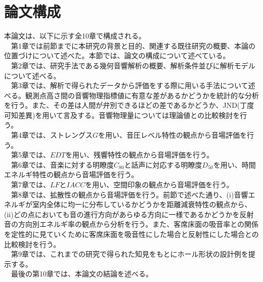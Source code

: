 \pagebreak
\section{論文構成}
本論文は、以下に示す全10章で構成される。
\\　第1章では前節までに本研究の背景と目的、関連する既往研究の概要、本論の位置づけについて述べた。本節では、論文の構成について述べている。
\\　第2章では、研究手法である幾何音響解析の概要、解析条件並びに解析モデルについて述べる。
\\　第3章では、解析で得られたデータから評価をする際に用いる手法について述べる。観測点高さ間の音響物理指標値に有意な差があるかどうかを統計的な分析を行う。また、その差は人間が弁別できるほどの差であるかどうか、JND(丁度可知差異)を用いて言及する。音響物理量については理論値との比較検討を行う。
\\　第4章では、ストレングス$G$を用い、音圧レベル特性の観点から音場評価を行う。
\\　第5章では、$EDT$を用い、残響特性の観点から音場評価を行う。
\\　第6章では、音楽に対する明瞭度$C_{80}$と話声に対応する明瞭度$D_{50}$を用い、時間エネルギ特性の観点から音場評価を行う。
\\　第7章では、$LF$と$IACC$を用い、空間印象の観点から音場評価を行う。
\\　第8章では、拡散性の観点から音場評価を行う。前節で述べた通り、(i)音響エネルギが室内全体に均一に分布しているかどうかを距離減衰特性の観点から、(i\hspace{-.05em}i)どの点においても音の進行方向があらゆる方向に一様であるかどうかを反射音の方向別エネルギ率の観点から分析を行う。また、客席床面の吸音率との関係を定性的に見ていくために客席床面を吸音性にした場合と反射性にした場合との比較検討を行う。
\\　第9章では、これまでの研究で得られた知見をもとにホール形状の設計例を提示する。
\\　最後の第10章では、本論文の結論を述べる。
